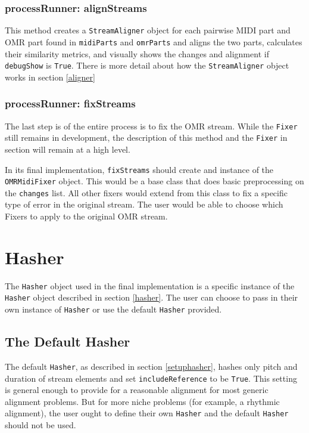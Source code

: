\subsubsection{processRunner: alignStreams}
This method creates a \texttt{StreamAligner} object for each pairwise MIDI part and OMR part found in \texttt{midiParts} and \texttt{omrParts} and aligns the two parts, calculates their similarity metrics, and visually shows the changes and alignment if \texttt{debugShow} is \texttt{True}. There is more detail about how the \texttt{StreamAligner} object works in section \ref{aligner}

\subsubsection{processRunner: fixStreams}
The last step is of the entire process is to fix the OMR stream. While the \texttt{Fixer} still remains in development, the description of this method and the \texttt{Fixer} in section \label{fixer} will remain at a high level. 

In its final implementation, \texttt{fixStreams} should create and instance of the \texttt{OMRMidiFixer} object. This would be a base class that does basic preprocessing on the \texttt{changes} list. All other fixers would extend from this class to fix a specific type of error in the original stream. The user would be able to choose which Fixers to apply to the original OMR stream.  

\section{Hasher}
The \texttt{Hasher} object used in the final implementation is a specific instance of the \texttt{Hasher} object described in section \ref{hasher}. The user can choose to pass in their own instance of \texttt{Hasher} or use the default \texttt{Hasher} provided.

\subsection{The Default Hasher}
The default \texttt{Hasher}, as described in section \ref{setuphasher}, hashes only pitch and duration of stream elements and set \texttt{includeReference} to be \texttt{True}. This setting is general enough to provide for a reasonable alignment for most generic alignment problems. But for more niche problems (for example, a rhythmic alignment), the user ought to define their own \texttt{Hasher} and the default \texttt{Hasher} should not be used. 

